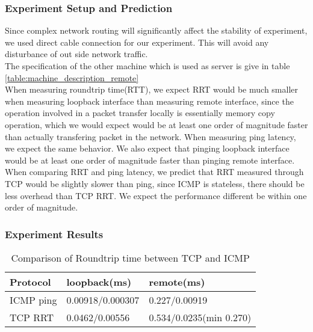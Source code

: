 \documentclass{article} %
\begin{document}
\subsubsection{Experiment Setup and Prediction}
Since complex network routing will significantly affect the stability of experiment, we used direct cable connection for our experiment. This will avoid any disturbance of out side network traffic. \\
The specification of the other machine which is used as server is give in table \ref{table:machine_description_remote}\\ 
When measuring roundtrip time(RTT), we expect RRT would be much smaller when measuring loopback interface than measuring remote interface, since the operation involved in a packet transfer locally is essentially memory copy operation, which we would expect would be at least one order of magnitude faster than actually transfering packet in the network. When measuring ping latency, we expect the same behavior. We also expect that pinging loopback interface would be at least one order of magnitude faster than pinging remote interface. \\
When comparing RRT and ping latency, we predict that RRT measured through TCP
would be slightly slower than ping, since ICMP is stateless, there should be
less overhead than TCP RRT\@. We expect the performance different be within one
order of magnitude.\\
\subsubsection{Experiment Results}

\begin{table}
  \begin{center}
    \caption{Comparison of Roundtrip time between TCP and ICMP}
    \begin{tabular}{|l|l|l|}
      \hline
      Protocol  & loopback(ms)     & remote(ms)              \\ \hline
      ICMP ping & 0.00918/0.000307 & 0.227/0.00919           \\ \hline
      TCP RRT   & 0.0462/0.00556   & 0.534/0.0235(min 0.270) \\ \hline
    \end{tabular}
    \label{table:roundtrip}
  \end{center}
\end{table}
\end{document}
